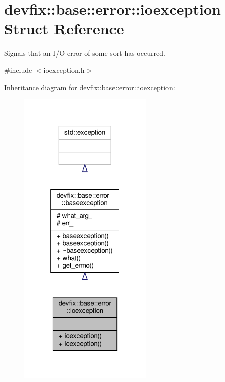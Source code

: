 \hypertarget{structdevfix_1_1base_1_1error_1_1ioexception}{}\section{devfix\+:\+:base\+:\+:error\+:\+:ioexception Struct Reference}
\label{structdevfix_1_1base_1_1error_1_1ioexception}


Signals that an I/O error of some sort has occurred.  




{\ttfamily \#include $<$ioexception.\+h$>$}



Inheritance diagram for devfix\+:\+:base\+:\+:error\+:\+:ioexception\+:\nopagebreak
\begin{figure}[H]
\begin{center}
\leavevmode
\includegraphics[width=181pt]{structdevfix_1_1base_1_1error_1_1ioexception__inherit__graph}
\end{center}
\end{figure}


